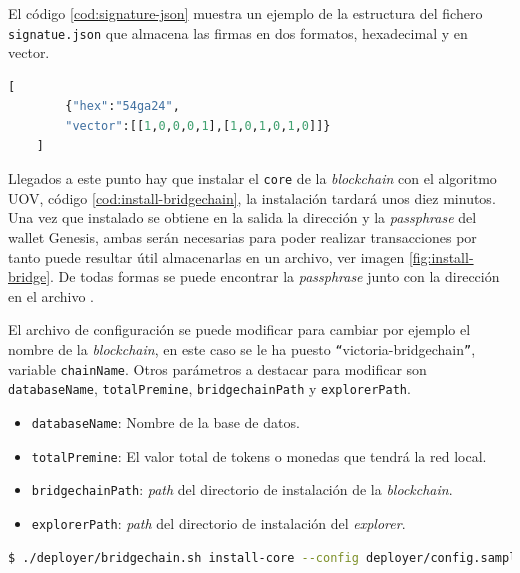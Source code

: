 El código \ref{cod:signature-json} muestra un ejemplo de la estructura del fichero \texttt{signatue.json} que almacena las firmas en dos formatos, hexadecimal y en vector.

\begin{lstlisting}[language=Python,caption=Ejemplo fichero \texttt{signature.json}, label=cod:signature-json]
	[
		{"hex":"54ga24",
		"vector":[[1,0,0,0,1],[1,0,1,0,1,0]]}
	]
\end{lstlisting}


Llegados a este punto hay que instalar el \texttt{core} de la \textit{blockchain} con el algoritmo UOV, código \ref{cod:install-bridgechain}, la instalación tardará unos diez minutos. Una vez que instalado se obtiene en la salida la dirección y la \textit{passphrase} del wallet Genesis, ambas serán necesarias para poder realizar transacciones por tanto puede resultar útil almacenarlas en un archivo, ver imagen \ref{fig:install-bridge}. De todas formas se puede encontrar la \textit{passphrase} junto con la dirección en el archivo . 

El archivo de configuración  se puede modificar para cambiar por ejemplo el nombre de la \textit{blockchain}, en este caso se le ha puesto  \texttt{``{}}victoria-bridgechain\texttt{''}, variable \texttt{chainName}. Otros parámetros a destacar para modificar son \texttt{databaseName}, \texttt{totalPremine}, \texttt{bridgechainPath} y \texttt{explorerPath}.

\begin{itemize}
	\item \texttt{databaseName}: Nombre de la base de datos.
	\item \texttt{totalPremine}: El valor total de tokens o monedas que tendrá la red local.
	\item \texttt{bridgechainPath}: \textit{path} del directorio de instalación de la \textit{blockchain}.
	\item \texttt{explorerPath}: \textit{path} del directorio de instalación del \textit{explorer}.
\end{itemize}

\begin{lstlisting}[language=Bash,caption=Instalación \textit{blockchain}. Parte XI, label=cod:install-bridgechain, style=Consola]
	$ ./deployer/bridgechain.sh install-core --config deployer/config.sample.conf --autoinstall-deps --non-interactive
\end{lstlisting}

